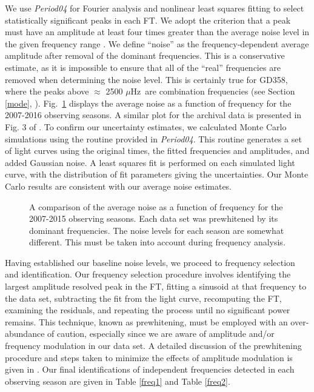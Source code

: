 \documentclass[12pt,preprint]{aastex}
\begin{document}
We use {\sl Period04} \citep{Lenz05} for Fourier analysis and nonlinear least squares fitting to 
select statistically significant peaks in each FT. We adopt the criterion that a peak must have 
an amplitude at least four times greater than the average noise level in the given frequency range 
\citep{Provencal12}. We define ``noise'' as the frequency-dependent 
average amplitude after removal of the dominant frequencies. This is a conservative estimate, 
as it is impossible to ensure that all of the ``real'' frequencies are removed when determining
the noise level. This is certainly true for GD358, where the peaks above $\approx$ 2500 $\mu$Hz\ 
are combination frequencies (see Section \ref{mode}, \citet{Provencal09}).  Fig.~\ref{noise} displays the average noise 
as a function of frequency for the 2007-2016 observing seasons. A similar plot for the 
archival data is presented in Fig. 3 of \citet{Provencal09}. To confirm our uncertainty 
estimates, we calculated Monte Carlo simulations using the routine provided in {\sl Period04}.  
This routine generates a set of light curves using the original times, the fitted frequencies and 
amplitudes, and added Gaussian noise. A least squares fit is performed on each simulated light 
curve, with the distribution of fit parameters giving the uncertainties. Our Monte Carlo results 
are consistent with our average noise estimates.

\begin{figure}
\caption{A comparison of the average noise as a function of frequency for the 2007-2015 observing 
seasons.  Each data set was prewhitened by its dominant frequencies.  The noise levels for each 
season are somewhat different.  This must be taken into account during frequency analysis.  
\label{noise}
}
\end{figure}

Having established our baseline noise levels, we proceed to frequency selection and identification.
Our frequency selection procedure involves identifying the largest amplitude resolved peak in the FT,
fitting a sinusoid at that frequency to the data set, subtracting the fit from the light curve, 
recomputing the FT, examining the residuals, and repeating the process until no significant power 
remains. This technique, known as prewhitening, must be employed with an over-abundance of caution, 
especially since we are aware of amplitude and/or frequency modulation in our data set. A detailed
discussion of the prewhitening procedure and steps taken to minimize the effects of amplitude 
modulation is given in \citet{Provencal09}. Our final identifications of independent frequencies
detected in each observing season are given in Table \ref{freq1} and Table \ref{freq2}.
\end{document}
